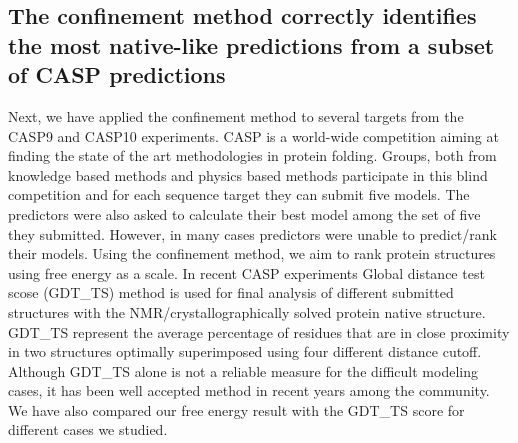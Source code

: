 \documentclass[12pt]{article}
\newcommand{\Justin}[1]{\color{blue}#1\normalcolor}
\begin{document}


\subsection{The confinement method correctly identifies the most native-like predictions from a
subset of CASP predictions}

Next, we have applied the confinement method to several targets from the CASP9 and CASP10
experiments. CASP is a world-wide competition aiming at finding the state of the art methodologies
in protein folding. Groups, both from knowledge based methods and physics based methods participate
in this blind competition and for each sequence target they can submit five models. The predictors
were also asked to calculate their best model among the set of five they submitted. However, in many
cases predictors were unable to predict/rank their models. Using the confinement method, we aim to
rank protein structures using free energy as a scale. In recent CASP experiments Global distance
test scose (GDT\_TS) method is used for final analysis of different submitted structures with the
NMR/crystallographically solved protein native structure. GDT\_TS represent the average percentage
of residues that are in close proximity in two structures optimally superimposed using four
different distance cutoff. Although GDT\_TS alone is not a reliable measure for the difficult
modeling cases, it has been well accepted method in recent years among the community. We have also
compared our free energy result with the GDT\_TS score for different cases we studied.
\end{document}
